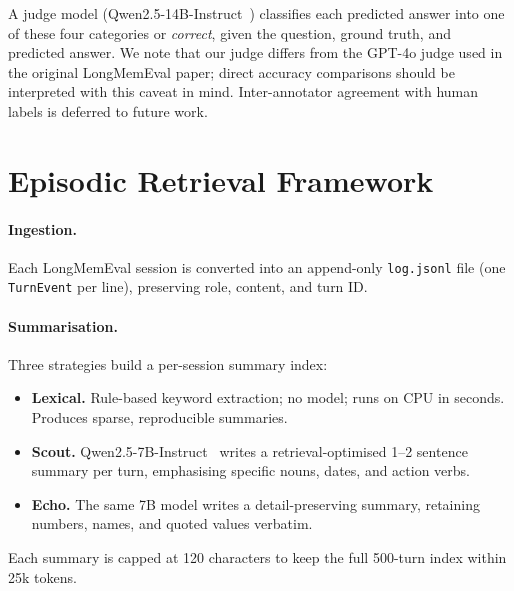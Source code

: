 \documentclass[11pt,twocolumn]{article}
\begin{document}
A judge model (Qwen2.5-14B-Instruct~\cite{qwen25}) classifies each
predicted answer into one of these four categories or \textit{correct},
given the question, ground truth, and predicted answer. We note that
our judge differs from the GPT-4o judge used in the original
LongMemEval paper; direct accuracy comparisons should be interpreted
with this caveat in mind. Inter-annotator agreement with human labels
is deferred to future work.

\section{Episodic Retrieval Framework}
\label{sec:framework}

\paragraph{Ingestion.} Each LongMemEval session is converted into an
append-only \texttt{log.jsonl} file (one \texttt{TurnEvent} per line),
preserving role, content, and turn ID.

\paragraph{Summarisation.} Three strategies build a per-session summary
index:
\begin{itemize}[leftmargin=*,itemsep=0pt,topsep=2pt]
  \item \textbf{Lexical.} Rule-based keyword extraction; no model; runs on
        CPU in seconds. Produces sparse, reproducible summaries.
  \item \textbf{Scout.} Qwen2.5-7B-Instruct~\cite{qwen25} writes a
        retrieval-optimised 1--2 sentence summary per turn, emphasising
        specific nouns, dates, and action verbs.
  \item \textbf{Echo.} The same 7B model writes a detail-preserving
        summary, retaining numbers, names, and quoted values verbatim.
\end{itemize}
Each summary is capped at 120 characters to keep the full 500-turn
index within 25k tokens.
\end{document}
